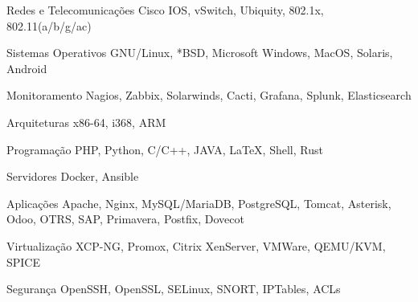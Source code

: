 


\begin{cvskills}


\cvskill
{Redes e Telecomunicações} %
{Cisco IOS, vSwitch, Ubiquity, 802.1x, 802.11(a/b/g/ac)} %


\cvskill
{Sistemas Operativos} %
{GNU/Linux, *BSD, Microsoft Windows, MacOS, Solaris, Android} %


\cvskill
{Monitoramento} %
{Nagios, Zabbix, Solarwinds, Cacti, Grafana, Splunk, Elasticsearch} %


\cvskill
{Arquiteturas} %
{x86-64, i368, ARM} %



\cvskill
{Programação} %
{PHP, Python, C/C++, JAVA, LaTeX, Shell, Rust} %


\cvskill
{Servidores} %
{Docker, Ansible} %


\cvskill
{Aplicações} %
{Apache, Nginx, MySQL/MariaDB, PostgreSQL, Tomcat, Asterisk, Odoo, OTRS, SAP, Primavera, Postfix, Dovecot} %


\cvskill
{Virtualização} %
{XCP-NG, Promox, Citrix XenServer, VMWare, QEMU/KVM, SPICE} %


\cvskill
{Segurança} %
{OpenSSH, OpenSSL, SELinux, SNORT, IPTables, ACLs} %


\end{cvskills}
